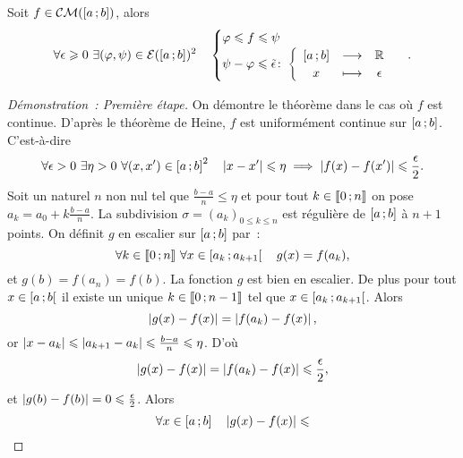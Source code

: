 \begin{theo}
  Soit \(f \in \mathcal{CM}(\left[ a \, ; {} b \right])\), alors
  \begin{equation}
    \forall \epsilon \geqslant 0 \ \exists (\varphi, \psi) \in
    \mathcal{E}(\left[ a \, ; {} b \right])^2 \quad \begin{cases} \varphi \leqslant f \leqslant
    \psi \\ \psi-\varphi \leqslant
    \tilde{\epsilon}\colon\left\{\begin{array}{ccc}\left[ a \, ; {} b \right] & \longrightarrow &\mathbb{R}\\x & \longmapsto & \epsilon\end{array}\right.
    \end{cases}.
  \end{equation}
\end{theo}
\begin{proof}[Démonstration~: Première étape]
  On démontre le théorème dans le cas où \(f\) est continue. D'après le théorème
  de Heine, \(f\) est uniformément continue sur \(\left[ a \, ; {} b \right]\).
  C'est-à-dire
  \begin{equation}
    \forall \epsilon >0 \ \exists \eta>0 \ \forall (x,x') \in
    \intervalleff{a}{b}^2 \quad \abs{x-x'} \leqslant \eta \implies
    \abs{f(x)-f(x')} \leqslant \frac{\epsilon}{2}.
  \end{equation}
  Soit un naturel \(n\) non nul tel que \(\frac{b-a}{n} \leqslant \eta\) et pour
  tout \(k \in \mathopen{\llbracket}0\mathclose{}\mathpunct{};n\mathclose{\rrbracket}\) on pose \(a_k=a_0+k \frac{b-a}{n}\). La
  subdivision \(\sigma=(a_k)_{0 \leqslant k \leqslant n}\) est régulière de
  \(\left[ a \, ; {} b \right]\) à \(n+1\) points. On définit \(g\) en escalier sur
  \(\left[ a \, ; {} b \right]\) par~:
  \begin{equation}
    \forall k \in \mathopen{\llbracket}0\mathclose{}\mathpunct{};n\mathclose{\rrbracket} \ \forall x \in
    \left[ a_k \, ; {} a_{k+1} \right[ \quad g(x)=f(a_k),
  \end{equation}
  et \(g(b)=f(a_n)=f(b)\). La fonction \(g\) est bien en escalier. De plus pour
  tout \(x \in \left[ a \, ; {} b \right[\) il existe un unique \(k \in
  \mathopen{\llbracket}0\mathclose{}\mathpunct{};n-1\mathclose{\rrbracket}\) tel que \(x \in \left[ a_k \, ; {} a_{k+1} \right[\).
  Alors
  \begin{equation}
    \left\lvert g(x)-f(x)\right\rvert = \left\lvert f(a_k)-f(x)\right\rvert,
  \end{equation}
  or \(\left\lvert x-a_k\right\rvert \leqslant \left\lvert a_{k+1}-a_k\right\rvert \leqslant \frac{b-a}{n}\leqslant
  \eta\). D'où
  \begin{equation}
    \left\lvert g(x)-f(x)\right\rvert = \left\lvert f(a_k)-f(x)\right\rvert \leqslant \frac{\epsilon}{2},
  \end{equation}
  et \(\left\lvert g(b)-f(b)\right\rvert=0 \leqslant \frac{\epsilon}{2}\). Alors
  \begin{equation}
    \forall x \in \intervalleff{a}{b} \quad \abs{g(x)-f(x)} \leqslant

\end{equation}
\end{proof}
